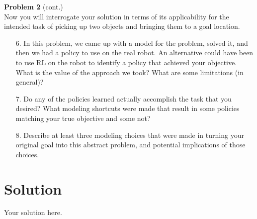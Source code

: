 \documentclass[submit]{harvardml}
\newenvironment{solution}
  {\color{blue}\section*{Solution}}
{}
\begin{document}
\newpage 

\begin{framed}
\textbf{Problem 2} (cont.)\\

Now you will interrogate your solution in terms of its applicability
for the intended task of picking up two objects and bringing them to a
goal location.

\begin{itemize}

  \item[6.] In this problem, we came up with a model for the problem,
    solved it, and then we had a policy to use on the real robot.  An
    alternative could have been to use RL on the robot to identify a
    policy that achieved your objective.  What is the value of the
    approach we took?  What are some limitations (in general)? 


  \item[7.] Do any of the policies learned actually accomplish the task
    that you desired?  What modeling shortcuts were made that result
    in some policies matching your true objective and some not?

    
  \item[8.] Describe at least three modeling choices that were made in
    turning your original goal into this abstract problem, and
    potential implications of those choices.
 

\end{itemize}

\end{framed}

\begin{solution}
	Your solution here.
\end{solution}
\end{document}
